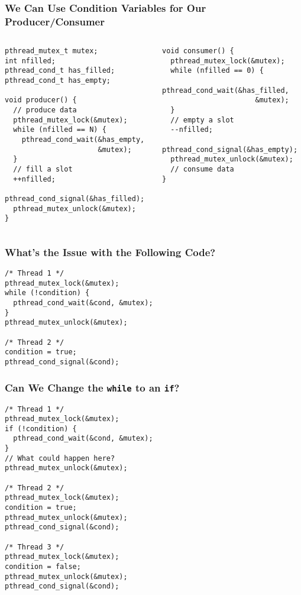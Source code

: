   \begin{frame}[fragile]
    \frametitle{We Can Use Condition Variables for Our Producer/Consumer}

    \begin{columns}
      \begin{column}{0.5\textwidth}
        \begin{lstlisting}
pthread_mutex_t mutex;
int nfilled;
pthread_cond_t has_filled;
pthread_cond_t has_empty;

void producer() {
  // produce data
  pthread_mutex_lock(&mutex);
  while (nfilled == N) {
    pthread_cond_wait(&has_empty,
                      &mutex);
  }
  // fill a slot
  ++nfilled;
  pthread_cond_signal(&has_filled);
  pthread_mutex_unlock(&mutex);
}
        \end{lstlisting}
      \end{column}
      \begin{column}{0.5\textwidth}
        \begin{lstlisting}
void consumer() {
  pthread_mutex_lock(&mutex);
  while (nfilled == 0) {
    pthread_cond_wait(&has_filled,
                      &mutex);
  }
  // empty a slot
  --nfilled;
  pthread_cond_signal(&has_empty);
  pthread_mutex_unlock(&mutex);
  // consume data
}
        \end{lstlisting}
      \end{column}
    \end{columns}
  \end{frame}

  \begin{frame}[fragile]
    \frametitle{What's the Issue with the Following Code?}

    \begin{lstlisting}
/* Thread 1 */
pthread_mutex_lock(&mutex);
while (!condition) {
  pthread_cond_wait(&cond, &mutex);
}
pthread_mutex_unlock(&mutex);

/* Thread 2 */
condition = true;
pthread_cond_signal(&cond);
    \end{lstlisting}
  \end{frame}

  \begin{frame}[fragile]
    \frametitle{Can We Change the \texttt{while} to an \texttt{if}?}

    \begin{lstlisting}
/* Thread 1 */
pthread_mutex_lock(&mutex);
if (!condition) {
  pthread_cond_wait(&cond, &mutex);
}
// What could happen here?
pthread_mutex_unlock(&mutex);

/* Thread 2 */
pthread_mutex_lock(&mutex);
condition = true;
pthread_mutex_unlock(&mutex);
pthread_cond_signal(&cond);

/* Thread 3 */
pthread_mutex_lock(&mutex);
condition = false;
pthread_mutex_unlock(&mutex);
pthread_cond_signal(&cond);
    \end{lstlisting}
  \end{frame}

